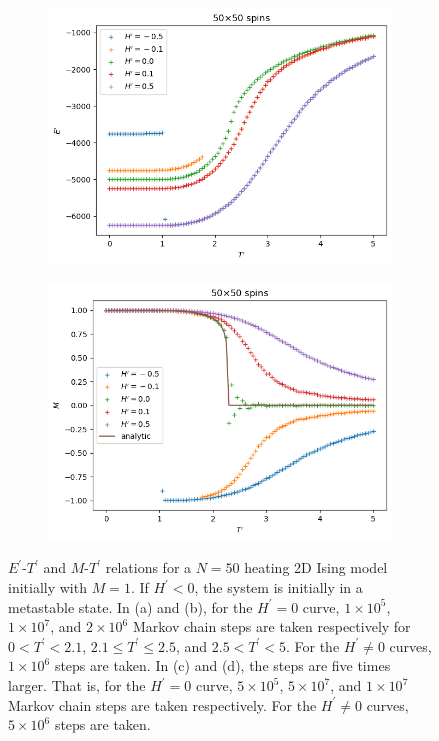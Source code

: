 \documentclass[11pt]{article}
\begin{document}
\begin{figure}[H]
    \begin{subfigure}[H]{0.48\textwidth}
        \centering
        \includegraphics[width=\textwidth]{Meta/energy_N50_steps500000-50000000-10000000_Hsteps5000000.png}
        \caption{}
        \label{meta50El}
    \end{subfigure}
    \hfill
    \begin{subfigure}[H]{0.48\textwidth}
        \centering
        \includegraphics[width=\textwidth]{Meta/magnetization_N50_steps500000-50000000-10000000_Hsteps5000000.png}
        \caption{}
        \label{meta50Ml}
    \end{subfigure}
    \caption{$E^\prime$-$T^\prime$ and $M$-$T^\prime$ relations for a $N = 50$ heating 2D Ising model initially with $M = 1$. If $H^\prime < 0$, the system is initially in a metastable state. In (a) and (b), for the $H^\prime = 0$ curve, $1 \times 10^5$, $1 \times 10^7$, and $2 \times 10^6$ Markov chain steps are taken respectively for $0 < T^\prime < 2.1$, $2.1 \leq T^\prime \leq 2.5$, and $2.5 < T^\prime < 5$. For the $H^\prime \neq 0$ curves, $1 \times 10^6$ steps are taken. In (c) and (d), the steps are five times larger. That is, for the $H^\prime = 0$ curve, $5 \times 10^5$, $5 \times 10^7$, and $1 \times 10^7$ Markov chain steps are taken respectively. For the $H^\prime \neq 0$ curves, $5 \times 10^6$ steps are taken.}
    \label{fig:meta50}
\end{figure}
\end{document}

